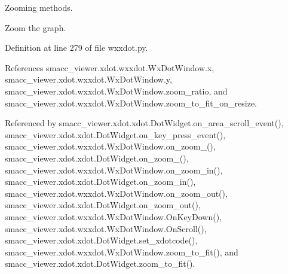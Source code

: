 Zooming methods. 

\begin{DoxyVerb}Zoom the graph.\end{DoxyVerb}
 

Definition at line 279 of file wxxdot.\+py.



References smacc\+\_\+viewer.\+xdot.\+wxxdot.\+Wx\+Dot\+Window.\+x, smacc\+\_\+viewer.\+xdot.\+wxxdot.\+Wx\+Dot\+Window.\+y, smacc\+\_\+viewer.\+xdot.\+wxxdot.\+Wx\+Dot\+Window.\+zoom\+\_\+ratio, and smacc\+\_\+viewer.\+xdot.\+wxxdot.\+Wx\+Dot\+Window.\+zoom\+\_\+to\+\_\+fit\+\_\+on\+\_\+resize.



Referenced by smacc\+\_\+viewer.\+xdot.\+xdot.\+Dot\+Widget.\+on\+\_\+area\+\_\+scroll\+\_\+event(), smacc\+\_\+viewer.\+xdot.\+xdot.\+Dot\+Widget.\+on\+\_\+key\+\_\+press\+\_\+event(), smacc\+\_\+viewer.\+xdot.\+wxxdot.\+Wx\+Dot\+Window.\+on\+\_\+zoom\+\_(), smacc\+\_\+viewer.\+xdot.\+xdot.\+Dot\+Widget.\+on\+\_\+zoom\+\_(), smacc\+\_\+viewer.\+xdot.\+wxxdot.\+Wx\+Dot\+Window.\+on\+\_\+zoom\+\_\+in(), smacc\+\_\+viewer.\+xdot.\+xdot.\+Dot\+Widget.\+on\+\_\+zoom\+\_\+in(), smacc\+\_\+viewer.\+xdot.\+wxxdot.\+Wx\+Dot\+Window.\+on\+\_\+zoom\+\_\+out(), smacc\+\_\+viewer.\+xdot.\+xdot.\+Dot\+Widget.\+on\+\_\+zoom\+\_\+out(), smacc\+\_\+viewer.\+xdot.\+wxxdot.\+Wx\+Dot\+Window.\+On\+Key\+Down(), smacc\+\_\+viewer.\+xdot.\+wxxdot.\+Wx\+Dot\+Window.\+On\+Scroll(), smacc\+\_\+viewer.\+xdot.\+xdot.\+Dot\+Widget.\+set\+\_\+xdotcode(), smacc\+\_\+viewer.\+xdot.\+wxxdot.\+Wx\+Dot\+Window.\+zoom\+\_\+to\+\_\+fit(), and smacc\+\_\+viewer.\+xdot.\+xdot.\+Dot\+Widget.\+zoom\+\_\+to\+\_\+fit().


